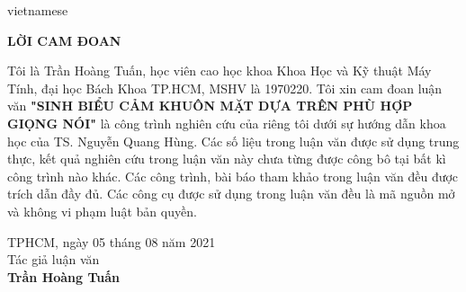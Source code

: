 \begin{titlepage}
\begin{otherlanguage*}{vietnamese}

\begin{center}
    \fontsize{18}{18}\textbf{LỜI CAM ĐOAN}
\end{center}

Tôi là Trần Hoàng Tuấn, học viên cao học khoa Khoa Học và Kỹ thuật Máy Tính, đại học Bách Khoa TP.HCM, MSHV là 1970220. Tôi xin cam đoan luận văn \textbf{"SINH BIỂU CẢM KHUÔN MẶT DỰA TRÊN PHÙ HỢP GIỌNG NÓI"} là công trình nghiên cứu của riêng tôi dưới sự hướng dẫn khoa học của TS. Nguyễn Quang Hùng. Các số liệu trong luận văn được sử dụng trung thực, kết quả nghiên cứu trong luận văn này chưa từng được công bô tại bất kì công trình nào khác. Các công trình, bài báo tham khảo trong luận văn đều được trích dẫn đầy đủ. Các công cụ được sử dụng trong luận văn đều là mã nguồn mở và không vi phạm luật bản quyền.

\begin{flushright}
    \begin{minipage}[t]{0.50\textwidth}
    \begin{center}
        TPHCM, ngày 05 tháng 08 năm 2021\\
        Tác giả luận văn\\
        \vspace{3cm}
        \textbf{Trần Hoàng Tuấn}
    \end{center}
    \end{minipage}
\end{flushright}


\end{otherlanguage*}
\vfill
\end{titlepage}